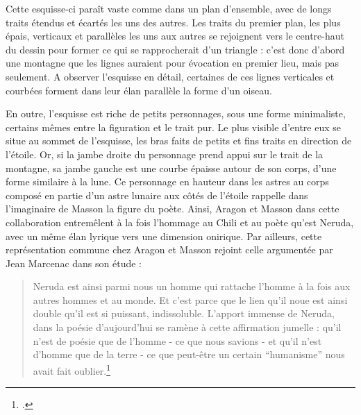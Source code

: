 	Cette esquisse-ci paraît vaste comme dans un plan d’ensemble, avec de longs traits étendus et écartés les uns des autres. Les traits du premier plan, les plus épais, verticaux et parallèles les uns aux autres se rejoignent vers le centre-haut du dessin pour former ce qui se rapprocherait d’un triangle : c’est donc d’abord une montagne que les lignes auraient pour évocation en premier lieu, mais pas seulement. A observer l’esquisse en détail, certaines de ces lignes verticales et courbées forment dans leur élan parallèle la forme d’un oiseau. 

En outre, l’esquisse est riche de petits personnages, sous une forme minimaliste, certains mêmes entre la figuration et le trait pur. Le plus visible d’entre eux se situe au sommet de l’esquisse, les bras faits de petits et fins traits en direction de l’étoile. Or, si la jambe droite du personnage prend appui sur le trait de la montagne, sa jambe gauche est une courbe épaisse autour de son corps, d’une forme similaire à la lune. Ce personnage en hauteur dans les astres au corps composé en partie d’un astre lunaire aux côtés de l’étoile rappelle dans l’imaginaire de Masson la figure du poète. Ainsi, Aragon et Masson dans cette collaboration entremêlent à la fois l’hommage au Chili et au poète qu’est Neruda, avec un même élan lyrique vers une dimension onirique. Par ailleurs, cette représentation commune chez Aragon et Masson rejoint celle argumentée par Jean Marcenac dans son étude :

\begin{quote}
Neruda est ainsi parmi nous un homme qui rattache l’homme à la fois aux autres hommes et au monde. Et c’est parce que le lien qu’il noue est ainsi double qu’il est si puissant, indissoluble. L’apport immense de Neruda, dans la poésie d’aujourd’hui se ramène à cette affirmation jumelle : qu’il n’est de poésie que de l’homme - ce que nous savions - et qu’il n’est d’homme que de la terre - ce que peut-être un certain \enquote{humanisme} nous avait fait oublier.\footcite[p119]{pabloneruda}\end{quote}

